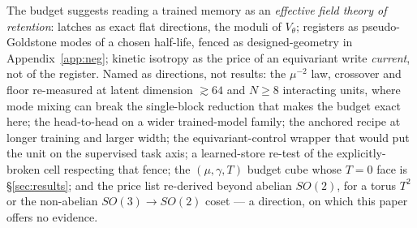\documentclass{article}
\begin{document}
The budget suggests reading a trained memory as an \emph{effective field theory of retention}: latches as exact flat directions, the moduli of $V_\theta$; registers as pseudo-Goldstone modes of a chosen half-life, fenced as designed-geometry in Appendix~\ref{app:neg}; kinetic isotropy as the price of an equivariant write \emph{current}, not of the register. Named as directions, not results: the $\mu^{-2}$ law, crossover and floor re-measured at latent dimension $\gtrsim64$ and $N\ge8$ interacting units, where mode mixing can break the single-block reduction that makes the budget exact here; the head-to-head on a wider trained-model family; the anchored recipe at longer training and larger width; the equivariant-control wrapper that would put the unit on the supervised task axis; a learned-store re-test of the explicitly-broken cell respecting that fence; the $(\mu,\gamma,T)$ budget cube whose $T=0$ face is \S\ref{sec:results}; and the price list re-derived beyond abelian $SO(2)$, for a torus $T^2$ or the non-abelian $SO(3)\to SO(2)$ coset --- a direction, on which this paper offers no evidence.
\end{document}
